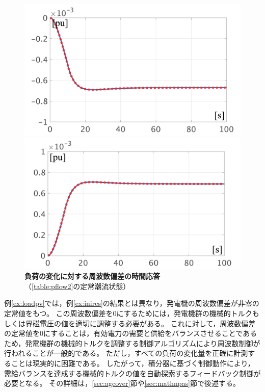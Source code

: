 \documentclass[tombow,dvipdfmx]{corona-a5-1.1}
\begin{document}
\begin{figure}[t]
  \centering
  {
  \begin{minipage}{0.49\linewidth}
    \centering
    \includegraphics[width = 1.0\linewidth]{figs/P3mi}
  \end{minipage}
  \begin{minipage}{0.49\linewidth}
    \centering
    \includegraphics[width = 1.0\linewidth]{figs/P3pl}
  \end{minipage}
  \medskip
  \caption{\textbf{負荷の変化に対する周波数偏差の時間応答}
  \\ \centering（\ref{table:pflow2}の定常潮流状態）}
  \label{fig:P3load}
  }
\medskip
\end{figure}

例\ref{ex:loadpv}では，例\ref{ex:inires}の結果とは異なり，発電機の周波数偏差が非零の定常値をもつ。
この周波数偏差を0にするためには，発電機群の機械的トルクもしくは界磁電圧の値を適切に調整する必要がある。
これに対して，周波数偏差の定常値を0にすることは，有効電力の需要と供給をバランスさせることであるため，発電機群の機械的トルクを調整する制御アルゴリズムにより周波数制御が行われることが一般的である。
ただし，すべての負荷の変化量を正確に計測することは現実的に困難である。
したがって，積分器に基づく制御動作により，需給バランスを達成する機械的トルクの値を自動探索するフィードバック制御が必要となる。
その詳細は，\ref{sec:agcover}節や\ref{sec:mathnpas}節で後述する。
\end{document}
